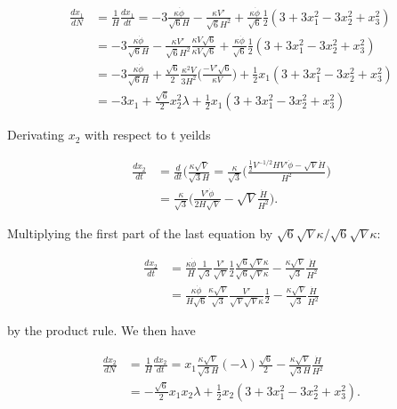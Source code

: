 \documentclass[a4paper,10pt]{article}
\begin{document}
\begin{align*}
\frac{dx_1}{dN} &= \frac{1}{H}\frac{dx_1}{dt} = -3\frac{\kappa \dot{\phi}}{\sqrt{6}H} - \frac{\kappa V'}{\sqrt{6}H^2} + \frac{\kappa \dot{\phi}}{\sqrt{6}}\frac{1}{2}(3 + 3x_1^2 - 3x_2^2 + x_3^2) \\
&=  -3\frac{\kappa \dot{\phi}}{\sqrt{6}H} - \frac{\kappa V'}{\sqrt{6}H^2} \frac{\kappa V \sqrt{6}}{\kappa V \sqrt{6}} + \frac{\kappa \dot{\phi}}{\sqrt{6}}\frac{1}{2}(3 + 3x_1^2 - 3x_2^2 + x_3^2) \\
&= -3\frac{\kappa \dot{\phi}}{\sqrt{6}H} + \frac{\sqrt{6}}{2}\frac{\kappa^2 V}{3H^2}\bigg(\frac{-V'\sqrt{6}}{\kappa V}\bigg) + \frac{1}{2}x_1(3 + 3x_1^2 - 3x_2^2 + x_3^2) \\
&= -3x_1 + \frac{\sqrt{6}}{2}x_2^2\lambda + \frac{1}{2}x_1(3 + 3x_1^2 - 3x_2^2 + x_3^2)
\end{align*}

Derivating $x_2$ with respect to t yeilds

\begin{align*}
\frac{dx_2}{dt} &= \frac{d}{dt}\bigg(\frac{\kappa\sqrt{V}}{\sqrt{3}H} = \frac{\kappa}{\sqrt{3}}\bigg(\frac{\frac{1}{2}V^{-1/2}HV'\dot{\phi} - \sqrt{V}\dot{H}}{H^2} \bigg) \\
&= \frac{\kappa}{\sqrt{3}}\bigg(\frac{V'\dot{\phi}}{2H\sqrt{V}} - \sqrt{V}\frac{\dot{H}}{H^2}\bigg).
\end{align*}

Multiplying the first part of the last equation by $\sqrt{6}\sqrt{V}\kappa/\sqrt{6}\sqrt{V}\kappa$:

\begin{align*}
\frac{dx_2}{dt} &= \frac{\kappa \dot{\phi}}{H} \frac{1}{\sqrt{3}}\frac{V'}{\sqrt{V}}\frac{1}{2}\frac{\sqrt{6}\sqrt{V}\kappa}{\sqrt{6}\sqrt{V}\kappa} - \frac{\kappa \sqrt{V}}{\sqrt{3}}\frac{\dot{H}}{H^2} \\ 
&= \frac{\kappa \dot{\phi}}{H\sqrt{6}} \frac{\kappa \sqrt{V}}{\sqrt{3}}\frac{V'}{\sqrt{V}\sqrt{V}\kappa}\frac{1}{2} - \frac{\kappa \sqrt{V}}{\sqrt{3}}\frac{\dot{H}}{H^2}
\end{align*}

by the product rule. We then have

\begin{align*}
\frac{dx_2}{dN} &= \frac{1}{H}\frac{dx_2}{dt} = x_1 \frac{\kappa \sqrt{V}}{\sqrt{3}H}(-\lambda)\frac{\sqrt{6}}{2} - \frac{\kappa \sqrt{V}}{\sqrt{3}H}\frac{\dot{H}}{H^2} \\
&= -\frac{\sqrt{6}}{2}x_1x_2\lambda + \frac{1}{2}x_2 (3 + 3x_1^2 - 3x_2^2 + x_3^2).
\end{align*}
\end{document}
